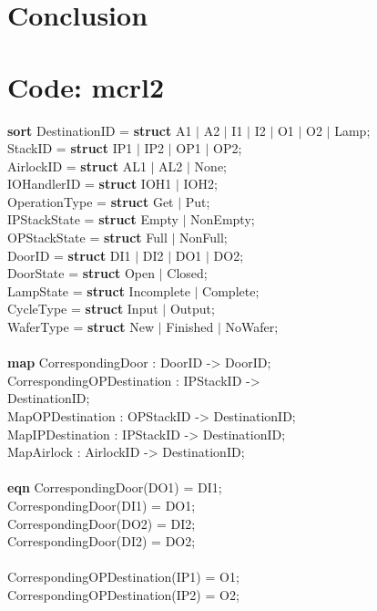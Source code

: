 \documentclass[a4paper,12pt]{article}
\begin{document}
\section{Conclusion}
\newpage
\appendix
\section{Code: mcrl2}
\textbf{sort} DestinationID = \textbf{struct} A1 $|$ A2 $|$ I1 $|$ I2 $|$ O1 $|$ O2 $|$ Lamp;
\\		  StackID = \textbf{struct} IP1 $|$ IP2 $|$ OP1 $|$ OP2;
\\		  AirlockID = \textbf{struct} AL1 $|$ AL2 $|$ None;
\\     IOHandlerID = \textbf{struct} IOH1 $|$ IOH2;
\\		  OperationType = \textbf{struct} Get $|$ Put;
\\		  IPStackState = \textbf{struct} Empty $|$ NonEmpty;
\\		  OPStackState = \textbf{struct} Full $|$ NonFull;
\\	    DoorID = \textbf{struct} DI1 $|$ DI2 $|$ DO1 $|$ DO2;		
\\		  DoorState = \textbf{struct} Open $|$ Closed;
\\			LampState = \textbf{struct} Incomplete $|$ Complete;
\\		  CycleType = \textbf{struct} Input $|$ Output;
\\		  WaferType = \textbf{struct} New $|$ Finished $|$ NoWafer;
\\
\\\textbf{map} CorrespondingDoor : DoorID -> DoorID;
\\	  CorrespondingOPDestination : IPStackID -> \\DestinationID;		
\\	  MapOPDestination : OPStackID -> DestinationID;
\\		MapIPDestination : IPStackID -> DestinationID;
\\		MapAirlock : AirlockID -> DestinationID;
\\
\\ \textbf{eqn} CorrespondingDoor(DO1) = DI1;
\\		CorrespondingDoor(DI1) = DO1;
\\		CorrespondingDoor(DO2) = DI2;
\\		CorrespondingDoor(DI2) = DO2;
\\
\\		CorrespondingOPDestination(IP1) = O1;
\\		CorrespondingOPDestination(IP2) = O2;
\end{document}
